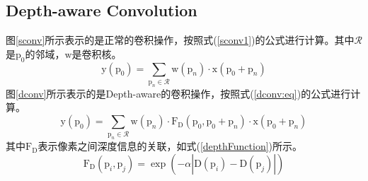 \documentclass[cn]{elegantbook}
\begin{document}
\subsection{Depth-aware Convolution}
图\ref{sconv}所示表示的是正常的卷积操作，按照式(\ref{sconv1})的公式进行计算。其中$\mathcal{R}$是$\mathrm{p}_0$的邻域，$\mathrm{w}$是卷积核。
	\begin{equation}
	\label{sconv1}
	\mathrm{y}(\mathrm{p}_0)=\sum_{\mathrm{p}_n\in \mathcal{R}}\mathrm{w}(\mathrm{p}_n)\cdot \mathrm{x}(\mathrm{p}_0+\mathrm{p}_n)
	\end{equation}
	图\ref{dconv}所示表示的是Depth-aware的卷积操作，按照式(\ref{dconv:eq})的公式进行计算。
	\begin{equation}
	\label{dconv:eq}
	\mathrm{y}(\mathrm{p}_0)=\sum_{\mathrm{p}_n\in \mathcal{R}}\mathrm{w}(\mathrm{p}_n)\cdot \mathrm{F_D}(\mathrm{p}_0,\mathrm{p}_0+\mathrm{p}_n)\cdot\mathrm{x}(\mathrm{p}_0+\mathrm{p}_n)
	\end{equation}
	其中$\mathrm{F_D}$表示像素之间深度信息的关联，如式(\ref{depthFunction})所示。
	\begin{equation}
	\label{depthFunction}
	\mathrm{F_D}(\mathrm{p}_i,\mathrm{p}_j)=\exp(-\alpha|\mathrm{D}(\mathrm{p}_i)-\mathrm{D}(\mathrm{p}_j)|)
	\end{equation}
	
\end{document}
